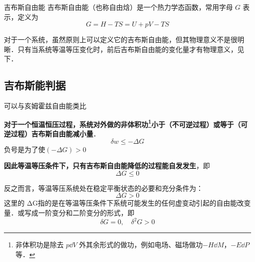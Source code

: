 
\begin{issues}
\end{issues}


\begin{definition}{吉布斯自由能}
吉布斯自由能（也称自由焓）是一个热力学态函数，常用字母 $G$ 表示，定义为
\begin{equation}
G=H-TS=U+pV-TS
\end{equation}
\end{definition}

对于一个系统，虽然原则上可以定义它的吉布斯自由能，但其物理意义不是很明晰．只有当系统等温等压变化时，前后吉布斯自由能的变化量才有物理意义，见下．

\subsection{吉布斯能判据}
可以与亥姆霍兹自由能类比

\begin{theorem}{}
\textbf{对于一个恒温恒压过程，系统对外做的非体积功\footnote{非体积功是除去 $p\dd V$ 外其余形式的做功，例如电场、磁场做功$-H\dd M$，$-E\dd P$ 等．}小于（不可逆过程）或等于（可逆过程）吉布斯自由能减小量}．
\begin{equation}
\delta w \le -\Delta G
\end{equation}
负号是为了使$(- \Delta G) > 0$
\end{theorem}

\begin{corollary}{}
\textbf{因此等温等压条件下，只有吉布斯自由能降低的过程能自发发生}，即
\begin{equation}
\Delta G \le 0
\end{equation}
\end{corollary}

\begin{corollary}{}
反之而言，等温等压系统处在稳定平衡状态的必要和充分条件为：
\begin{equation}
\Delta G>0
\end{equation}
这里的 ΔG指的是在等温等压条件下系统可能发生的任何虚变动引起的自由能改变量．或写成一阶变分和二阶变分的形式，即
\begin{equation}\label{GibbsG_eq2}
\delta G=0,\quad \delta^2 G>0
\end{equation}
\end{corollary}

